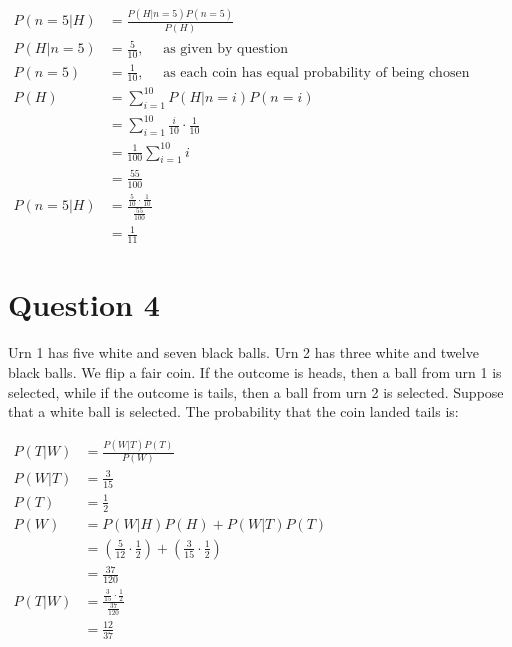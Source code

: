 \documentclass{article}
\begin{document}
$\begin{aligned}
        P(n=5|H) & = \frac{P(H|n=5)P(n=5)}{P(H)}                                                  \\
        P(H|n=5) & = \frac{5}{10},\quad\text{ as given by question}                               \\
        P(n=5)   & = \frac{1}{10},\quad\text{ as each coin has equal probability of being chosen} \\
        P(H)     & = \sum_{i=1}^{10} P(H|n=i)P(n=i)                                               \\
                 & = \sum_{i=1}^{10} \frac{i}{10} \cdot \frac{1}{10}                              \\
                 & = \frac{1}{100} \sum_{i=1}^{10} i                                              \\
                 & = \frac{55}{100}                                                               \\
        P(n=5|H) & = \frac{\frac{5}{10} \cdot \frac{1}{10}}{\frac{55}{100}}                       \\
                 & = \frac{1}{11}
    \end{aligned}
$

\section*{Question 4}

Urn 1 has five white and seven black balls. Urn 2 has three white and twelve black balls. We flip a fair coin. If the outcome is heads, then a ball from urn 1 is selected, while if the outcome is tails, then a ball from urn 2 is selected. Suppose that a white ball is selected. The probability that the coin landed tails is:

$\begin{aligned}
        P(T|W) & = \frac{P(W|T)P(T)}{P(W)}                                             \\
        P(W|T) & = \frac{3}{15}                                                        \\
        P(T)   & = \frac{1}{2}                                                         \\
        P(W)   & = P(W|H)P(H) + P(W|T)P(T)                                             \\
               & = (\frac{5}{12} \cdot \frac{1}{2}) + (\frac{3}{15} \cdot \frac{1}{2}) \\
               & = \frac{37}{120}                                                      \\
        P(T|W) & = \frac{\frac{3}{15} \cdot \frac{1}{2}}{\frac{37}{120}}               \\
               & = \frac{12}{37}
    \end{aligned}$
\end{document}
